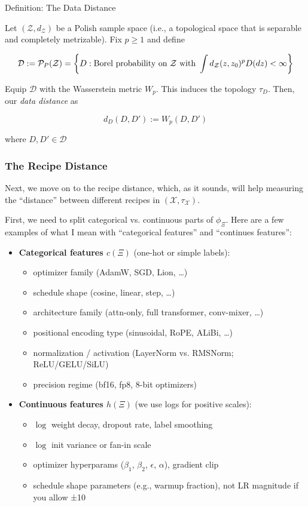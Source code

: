 \documentclass[12pt]{article}
\begin{document}
\begin{statementbox}{Definition: The Data Distance}

Let $(\mathcal Z,d_\mathcal Z)$ be a Polish sample space (i.e., a topological space that is separable and completely metrizable). Fix $p\ge 1$ and define

\[
\mathcal D := \mathcal P_P(\mathcal Z)\\=\left\{
D:\text{Borel probability on }\mathcal Z \text{ with } \int d_\mathcal Z (z,z_0)^pD(dz)<\infty
\right\}
\]

Equip $\mathcal D$ with the Wasserstein metric $W_p$. This induces the topology $\tau_D$. Then, our \textit{data distance} as

\[
d_D(D,D'):= W_p(D,D')
\]

where $D,D'\in \mathcal D$

\end{statementbox}

\subsubsection{The Recipe Distance}

Next, we move on to the recipe distance, which, as it sounds, will help measuring the “distance” between different recipes in $(\mathcal X, \tau_\mathcal X)$.

First, we need to split categorical vs. continuous parts of $\phi_\Xi$. Here are a few examples of what I mean with “categorical features” and “continues features”:

\begin{itemize}
    \item \textbf{Categorical features $c(\Xi)$} (one-hot or simple labels): \begin{itemize}
        \item optimizer family (AdamW, SGD, Lion, …)
        \item schedule shape (cosine, linear, step, …)
        \item architecture family (attn-only, full transformer, conv-mixer, …)
        \item positional encoding type (sinusoidal, RoPE, ALiBi, …)
        \item normalization / activation (LayerNorm vs. RMSNorm; ReLU/GELU/SiLU)
        \item precision regime (bf16, fp8, 8-bit optimizers)
    \end{itemize}
    \item \textbf{Continuous features $h(\Xi)$} (we use logs for positive scales): \begin{itemize}
        \item $\log$ weight decay, dropout rate, label smoothing
        \item $\log $ init variance or fan-in scale
        \item optimizer hyperparams ($\beta_1$, $\beta_2$, $\epsilon$, $\alpha$), gradient clip
        \item schedule shape parameters (e.g., warmup fraction), not LR magnitude if you allow ±10%
    \end{itemize}
\end{itemize}
\end{document}
